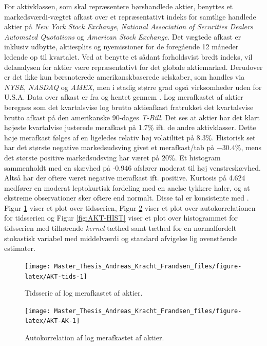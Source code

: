 \documentclass[
  a4paper,
  oneside]{memoir}
\begin{document}
For aktivklassen, som skal repræsentere børshandlede aktier, benyttes et markedsværdi-vægtet afkast over et repræsentativt indeks for samtlige handlede aktier på \emph{New York Stock Exchange}, \emph{National Association of Securities Dealers Automated Quotations} og \emph{American Stock Exchange}. Det vægtede afkast er inklusiv udbytte, aktiesplits og nyemissioner for de foregående 12 måneder ledende op til kvartalet. Ved at benytte et sådant forholdsvist bredt indeks, vil delanalysen for aktier være repræsentativt for det globale aktiemarked. Derudover er det ikke kun børsnoterede amerikanskbaserede selskaber, som handles via \emph{NYSE}, \emph{NASDAQ} og \emph{AMEX}, men i stadig større grad også virksomheder uden for U.S.A. Data over afkast er fra \citep{CRSPakt} og hentet gennem \citep{WRDSakt}. Log merafkastet af aktier beregnes som det kvartalsvise log brutto aktieafkast fratrukket det kvartalsvise brutto afkast på den amerikanske 90-dages \emph{T-Bill}. Det ses at aktier har det klart højeste kvartalvise justerede merafkast på 1.7\(\%\) ift. de andre aktivklasser. Dette høje merafkast følges af en ligeledes relativ høj volatilitet på 8.3\(\%\). Historisk set har det største negative markedsudsving givet et merafkast/tab på \(-30.4\%\), mens det største positive markedsudsving har været på \(20\%\). Et histogram sammenholdt med en skævhed på -0.946 afslører moderat til høj venstreskævhed. Altså har der oftere været negative merafkast ift. positive. Kurtosis på 4.624 medfører en moderat leptokurtisk fordeling med en anelse tykkere haler, og at ekstreme observationer sker oftere end normalt. Disse tal er konsistente med \citep{CampVic2003}. Figur \ref{fig:AKT-tids} viser et plot over tidsserien, Figur \ref{fig:AKT-AK} viser et plot over autokorrelationen for tidsserien og Figur \ref{fig:AKT-HIST} viser et plot over histogrammet for tidsserien med tilhørende \emph{kernel} tæthed samt tæthed for en normalfordelt stokastisk variabel med middelværdi og standard afvigelse lig ovenstående estimater.

\begin{figure}[H]

{\centering \texttt{[image: Master\_Thesis\_Andreas\_Kracht\_Frandsen\_files/figure-latex/AKT-tids-1]} 

}

\caption{Tidsserie af log merafkastet af aktier.}\label{fig:AKT-tids}
\end{figure}

\begin{figure}[H]

{\centering \texttt{[image: Master\_Thesis\_Andreas\_Kracht\_Frandsen\_files/figure-latex/AKT-AK-1]} 

}

\caption{Autokorrelation af log merafkastet af aktier.}\label{fig:AKT-AK}
\end{figure}
\end{document}
